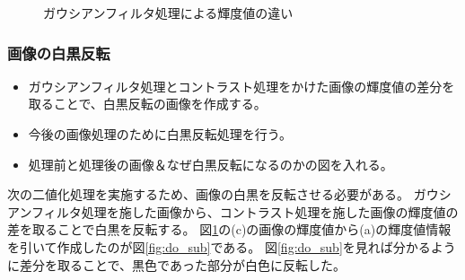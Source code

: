 \documentclass[12pt,a4paper]{jarticle}
\begin{document}
\begin{figure}[htbp]
\begin{center}
\begin{tabular}{c}
      \end{tabular}
      \caption{ガウシアンフィルタ処理による輝度値の違い\label{fig:do_gau_beforeandafter}}
    \end{center}
\end{figure}
\subsubsection{画像の白黒反転}
\begin{itemize}
    \item ガウシアンフィルタ処理とコントラスト処理をかけた画像の輝度値の差分を取ることで、白黒反転の画像を作成する。
    \item 今後の画像処理のために白黒反転処理を行う。
    \item 処理前と処理後の画像＆なぜ白黒反転になるのかの図を入れる。
\end{itemize}
次の二値化処理を実施するため、画像の白黒を反転させる必要がある。
ガウシアンフィルタ処理を施した画像から、コントラスト処理を施した画像の輝度値の差を取ることで白黒を反転する。
図\ref{fig:do_gau_beforeandafter}の(c)の画像の輝度値から(a)の輝度値情報を引いて作成したのが図\ref{fig:do_sub}である。
図\ref{fig:do_sub}を見れば分かるように差分を取ることで、黒色であった部分が白色に反転した。
\end{document}
